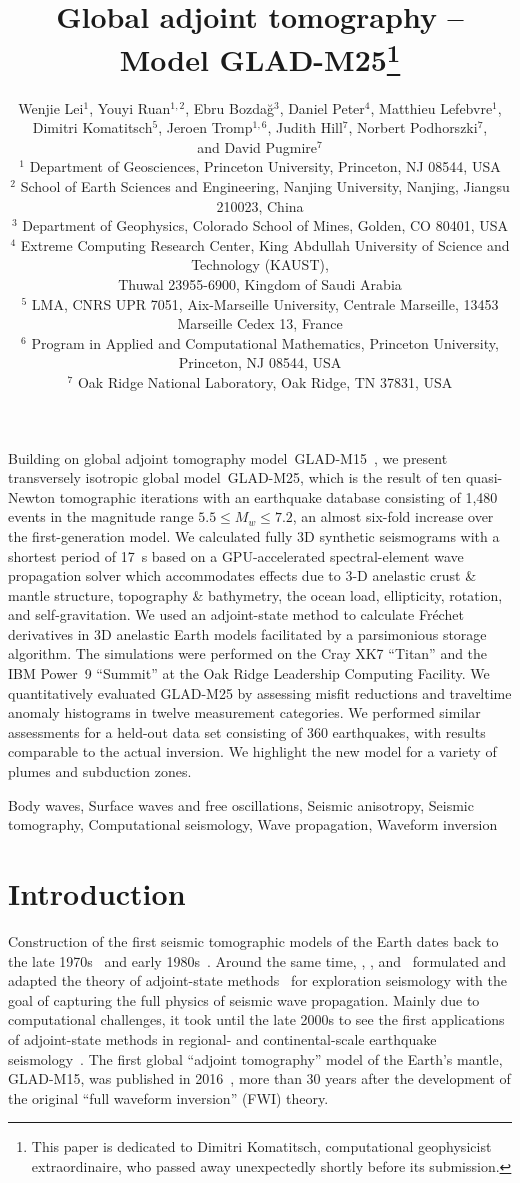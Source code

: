 \documentclass[extra,mreferee]{gji}
\title[Global Adjoint Tomography -- Model GLAD-M25]
  {Global adjoint tomography -- Model GLAD-M25\footnote{This paper is dedicated to Dimitri Komatitsch, computational geophysicist extraordinaire, who passed away unexpectedly shortly before its submission.}}
\author[Lei et al.]
  {Wenjie Lei$^1$, Youyi Ruan$^{1,2}$, Ebru Bozda\u g$^3$, Daniel Peter$^4$, Matthieu Lefebvre$^1$, \\{\LARGE \rm Dimitri Komatitsch$^5$, Jeroen Tromp$^{1,6}$, Judith Hill$^7$, Norbert Podhorszki$^7$}, \\ {\LARGE \rm and David Pugmire$^7$} \\
  $^1$ Department of Geosciences, Princeton University, Princeton, NJ 08544, USA\\
  $^2$ School of Earth Sciences and Engineering, Nanjing University, Nanjing, Jiangsu 210023, China\\
  $^3$ Department of Geophysics, Colorado School of Mines, Golden, CO 80401, USA\\
  $^4$ Extreme Computing Research Center, King Abdullah University of Science and Technology (KAUST), \\Thuwal 23955-6900, Kingdom of Saudi Arabia\\
  $^5$ LMA, CNRS UPR 7051, Aix-Marseille University, Centrale Marseille, 13453 Marseille Cedex 13, France\\
  $^6$ Program in Applied and Computational Mathematics, Princeton University, Princeton, NJ 08544, USA\\
  $^7$ Oak Ridge National Laboratory, Oak Ridge, TN 37831, USA
  }
\begin{document}
\maketitle

%
%
\begin{summary}
Building on global adjoint tomography model~GLAD-M15~\citep{bozdaug2016global}, we present transversely isotropic global model~GLAD-M25,
which is the result of ten quasi-Newton tomographic iterations with an
earthquake database consisting of 1,480 events in the magnitude range $5.5\le M_w \le 7.2$,
an almost six-fold increase over the first-generation model.
We calculated fully 3D synthetic seismograms with a shortest period of 17~s based on a GPU-accelerated spectral-element wave
propagation solver which accommodates effects due to 3-D anelastic crust \& mantle structure, topography \& bathymetry, the ocean load, ellipticity, rotation, and self-gravitation.
We used an adjoint-state method to calculate Fr\'echet derivatives in 3D anelastic Earth models
facilitated by a parsimonious storage algorithm.
The simulations were performed on the Cray XK7 ``Titan'' and the IBM Power~9 ``Summit'' at the Oak Ridge Leadership Computing Facility.
We quantitatively evaluated GLAD-M25 by assessing misfit reductions and traveltime anomaly histograms in twelve measurement
categories.
We performed similar assessments for a held-out data set consisting of 360 earthquakes,
with results comparable to the actual inversion.
We highlight the new model for a variety of plumes and subduction zones.
\end{summary}

\begin{keywords}
Body waves, Surface waves and free oscillations, Seismic anisotropy, Seismic tomography, Computational seismology, Wave propagation, Waveform inversion
\end{keywords}

\section{Introduction}

Construction of the first seismic tomographic models of the Earth dates back to the late 1970s~\citep{Aki77,Dziewonski77,SenTok77} and early 1980s~\citep[e.g.,][]{WD84,Nataf1984}.
Around the same time,
\cite{BaChLa77}, \cite{Lailly1983}, and~\cite{Tar84} formulated and adapted the theory of adjoint-state methods~\citep{Chavent1974} for exploration seismology with the goal of capturing the full physics of seismic wave propagation.
Mainly due to computational challenges,
it took until the late 2000s to see the first applications of adjoint-state methods in regional- and continental-scale earthquake seismology~\citep{tape2009adjoint,Fichtner09,zhu2012structure}.
The first global ``adjoint tomography'' model of the Earth's mantle,
GLAD-M15, was published in 2016~\citep{bozdaug2016global}, more than 30 years after the development of the original ``full waveform inversion'' (FWI) theory.
\end{document}
